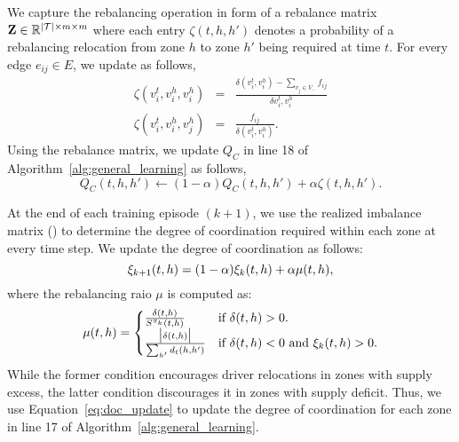 We capture the rebalancing operation in form of a rebalance matrix 
    ${{\mathbf{Z}}} \in \mathbb{R}^{|{{\mathcal{T}}}|
    \times m \times m}$ where each entry $\zeta(t, h, h')$ denotes a probability of
    a rebalancing relocation from zone $h$ to zone $h'$ being required at time $t$.
For every edge $e_{ij} \in E$, we update {\rebalancematrix} as follows,
    \begin{eqnarray*}
        \zeta(v_i^t, v_i^h, v_i^h) &=& 
            \frac{\delta(v_i^t, v_i^h) -\sum_{v_j \in V_-} f_{ij}}{\delta{v_i^t,
            v_i^h}} \nonumber\\
        \zeta(v_i^t, v_i^h, v_j^h) &=& \frac{f_{ij}}{\delta(v_i^t, v_i^h)}.
    \end{eqnarray*}
Using the rebalance matrix, we update $Q_C$ in line 18 of
    Algorithm~\ref{alg:general_learning} as follows,
    \begin{equation}
    \label{eq:Q_C_update}
        Q_C(t, h, h') \leftarrow (1 - \alpha)Q_C(t, h, h') + \alpha \zeta(t,
        h, h').
    \end{equation}

At the end of each training episode $(k+1)$, we use the realized imbalance
    matrix ({\imbalancematrix}) to determine the degree of coordination required 
    within each zone at
    every time step.  
We update the degree of coordination as follows:
    \begin{equation}
    \label{eq:doc_update}
        \coordination_{k+1}(t, h) = (1 - \alpha)\coordination_{k}(t, h) + \alpha\mu(t, h),
    \end{equation}
    where the rebalancing raio $\mu$ is computed as:
    \begin{equation*}
        \mu(t, h) = 
        \begin{cases}
        \frac{\delta(t,h)}{S^{{{\pi}}_k}(t, h)} &\text{if }
            \delta(t,h) > 0. \\ 
            \frac{\big|\delta(t, h)\big|}{\sum_{h'}d_t(h,h')} &\text{if }
            \delta(t,h) < 0\text{ and } {{\ensuremath{\xi}}}_{k}(t, h) > 0. 
        \end{cases}
    \end{equation*}
While the former condition encourages driver relocations in zones with supply excess, 
    the latter condition discourages it in zones with supply deficit.
Thus, we use Equation~\eqref{eq:doc_update} to update the degree of coordination
    for each zone in line 17 of Algorithm~\ref{alg:general_learning}.
\iffalse
